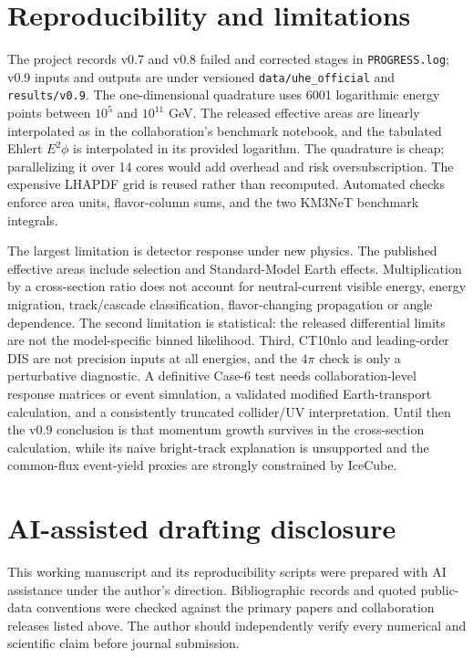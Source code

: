 \documentclass[11pt,a4paper]{article}
\begin{document}
\section{Reproducibility and limitations}
The project records v0.7 and v0.8 failed and corrected stages in
\texttt{PROGRESS.log}; v0.9 inputs and outputs are under versioned
\texttt{data/uhe\_official} and \texttt{results/v0.9}.  The one-dimensional
quadrature uses 6001 logarithmic energy points between $10^5$ and
$10^{11}$ GeV.  The released effective areas are linearly interpolated as
in the collaboration's benchmark notebook, and the tabulated Ehlert
$E^2\phi$ is interpolated in its provided logarithm.  The quadrature is
cheap; parallelizing it over 14 cores would add overhead and risk
oversubscription.  The expensive LHAPDF grid is reused rather than
recomputed.  Automated checks enforce area units, flavor-column sums,
and the two KM3NeT benchmark integrals.

The largest limitation is detector response under new physics.  The
published effective areas include selection and Standard-Model Earth
effects.  Multiplication by a cross-section ratio does not account for
neutral-current visible energy, energy migration, track/cascade
classification, flavor-changing propagation or angle dependence.  The
second limitation is statistical: the released differential limits are
not the model-specific binned likelihood.  Third, CT10nlo and leading-order
DIS are not precision inputs at all energies, and the $4\pi$ check is
only a perturbative diagnostic.  A definitive Case-6 test needs
collaboration-level response matrices or event simulation, a validated
modified Earth-transport calculation, and a consistently truncated
collider/UV interpretation.  Until then the v0.9 conclusion is that
momentum growth survives in the cross-section calculation, while its
naive bright-track explanation is unsupported and the common-flux
event-yield proxies are strongly constrained by IceCube.

\section*{AI-assisted drafting disclosure}
This working manuscript and its reproducibility scripts were prepared with
AI assistance under the author's direction.  Bibliographic records and
quoted public-data conventions were checked against the primary papers and
collaboration releases listed above.  The author should independently
verify every numerical and scientific claim before journal submission.



\end{document}

